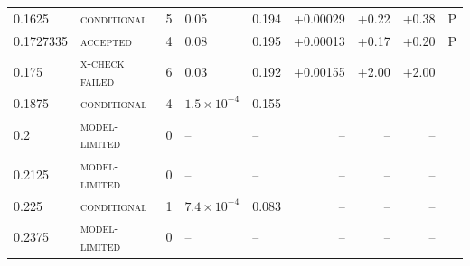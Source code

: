 \documentclass[10pt,a4paper]{article}
\newcommand{\lbl}[1]{{\mdseries\scshape #1}}
\begin{document}
\begin{table}[htbp]
\begin{tabular}{@{}llrllrrrl@{}}
0.1625 & \lbl{conditional} & 5 & 0.05 & 0.194 & +0.00029 & +0.22 & +0.38 & P \\
0.1727335 & \lbl{accepted} & 4 & 0.08 & 0.195 & +0.00013 & +0.17 & +0.20 & P \\
0.175 & \lbl{x-check failed} & 6 & 0.03 & 0.192 & +0.00155 & +2.00 & +2.00 &  \\
0.1875 & \lbl{conditional} & 4 & $1.5\times10^{-4}$ & 0.155 & -- & -- & -- &  \\
0.2 & \lbl{model-limited} & 0 & -- & -- & -- & -- & -- &  \\
0.2125 & \lbl{model-limited} & 0 & -- & -- & -- & -- & -- &  \\
0.225 & \lbl{conditional} & 1 & $7.4\times10^{-4}$ & 0.083 & -- & -- & -- &  \\
0.2375 & \lbl{model-limited} & 0 & -- & -- & -- & -- & -- &  \\
\bottomrule\end{tabular}
\end{table}
\end{document}
